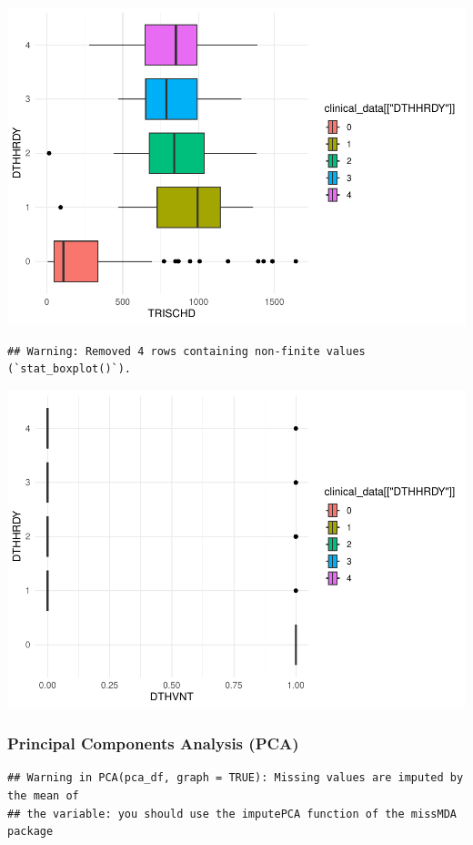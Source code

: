 \documentclass[
]{article}
\begin{document}
\includegraphics{Q1_markdown_files/figure-latex/unnamed-chunk-8-12.pdf}

\begin{verbatim}
## Warning: Removed 4 rows containing non-finite values (`stat_boxplot()`).
\end{verbatim}

\includegraphics{Q1_markdown_files/figure-latex/unnamed-chunk-8-13.pdf}

\hypertarget{principal-components-analysis-pca}{%
\subsubsection{Principal Components Analysis
(PCA)}\label{principal-components-analysis-pca}}

\begin{verbatim}
## Warning in PCA(pca_df, graph = TRUE): Missing values are imputed by the mean of
## the variable: you should use the imputePCA function of the missMDA package
\end{verbatim}
\end{document}
